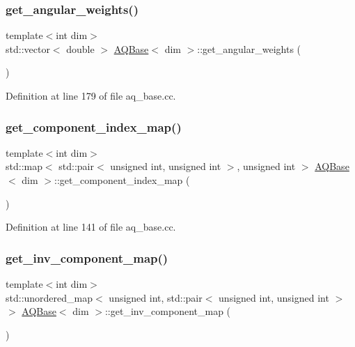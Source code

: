 \subsubsection{\texorpdfstring{get\+\_\+angular\+\_\+weights()}{get\_angular\_weights()}}
{\footnotesize\ttfamily template$<$int dim$>$ \\
std\+::vector$<$ double $>$ \hyperlink{class_a_q_base}{A\+Q\+Base}$<$ dim $>$\+::get\+\_\+angular\+\_\+weights (\begin{DoxyParamCaption}{ }\end{DoxyParamCaption})}



Definition at line 179 of file aq\+\_\+base.\+cc.

\mbox{\label{class_a_q_base_a016f7ac88052a26c82c8aa3bfba80f73}} 
\subsubsection{\texorpdfstring{get\+\_\+component\+\_\+index\+\_\+map()}{get\_component\_index\_map()}}
{\footnotesize\ttfamily template$<$int dim$>$ \\
std\+::map$<$ std\+::pair$<$ unsigned int, unsigned int $>$, unsigned int $>$ \hyperlink{class_a_q_base}{A\+Q\+Base}$<$ dim $>$\+::get\+\_\+component\+\_\+index\+\_\+map (\begin{DoxyParamCaption}{ }\end{DoxyParamCaption})}



Definition at line 141 of file aq\+\_\+base.\+cc.

\mbox{\label{class_a_q_base_a6c6f10b941afa4019a5d919eee33ebee}} 
\subsubsection{\texorpdfstring{get\+\_\+inv\+\_\+component\+\_\+map()}{get\_inv\_component\_map()}}
{\footnotesize\ttfamily template$<$int dim$>$ \\
std\+::unordered\+\_\+map$<$ unsigned int, std\+::pair$<$ unsigned int, unsigned int $>$ $>$ \hyperlink{class_a_q_base}{A\+Q\+Base}$<$ dim $>$\+::get\+\_\+inv\+\_\+component\+\_\+map (\begin{DoxyParamCaption}{ }\end{DoxyParamCaption})}



